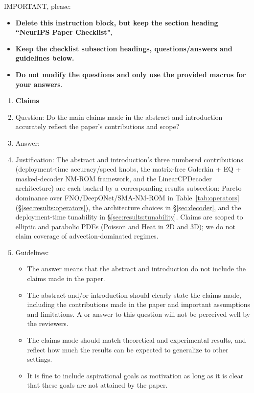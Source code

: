 IMPORTANT, please:
\begin{itemize}
    \item {\bf Delete this instruction block, but keep the section heading ``NeurIPS Paper Checklist"},
    \item  {\bf Keep the checklist subsection headings, questions/answers and guidelines below.}
    \item {\bf Do not modify the questions and only use the provided macros for your answers}.
\end{itemize} 
 



\begin{enumerate}

\item {\bf Claims}
    \item[] Question: Do the main claims made in the abstract and introduction accurately reflect the paper's contributions and scope?
    \item[] Answer: \answerYes{}
    \item[] Justification: The abstract and introduction's three numbered contributions (deployment-time accuracy/speed knobs, the matrix-free Galerkin + EQ + masked-decoder NM-ROM framework, and the LinearCPDecoder architecture) are each backed by a corresponding results subsection: Pareto dominance over FNO/DeepONet/SMA-NM-ROM in Table~\ref{tab:operators} (\S\ref{sec:results:operators}), the architecture choices in \S\ref{sec:decoder}, and the deployment-time tunability in \S\ref{sec:results:tunability}. Claims are scoped to elliptic and parabolic PDEs (Poisson and Heat in 2D and 3D); we do not claim coverage of advection-dominated regimes.
    \item[] Guidelines:
    \begin{itemize}
        \item The answer \answerNA{} means that the abstract and introduction do not include the claims made in the paper.
        \item The abstract and/or introduction should clearly state the claims made, including the contributions made in the paper and important assumptions and limitations. A \answerNo{} or \answerNA{} answer to this question will not be perceived well by the reviewers. 
        \item The claims made should match theoretical and experimental results, and reflect how much the results can be expected to generalize to other settings. 
        \item It is fine to include aspirational goals as motivation as long as it is clear that these goals are not attained by the paper. 
    \end{itemize}


\end{enumerate}
